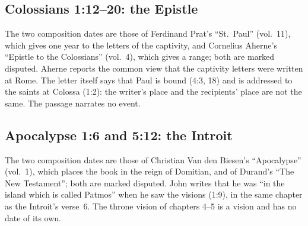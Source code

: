 \subsection{Colossians 1:12--20: the Epistle}
\label{sec:date-colossians}

The two composition dates are those of Ferdinand Prat's ``St.~Paul''
(vol.~11), which gives one year to the letters of the captivity, and Cornelius
Aherne's ``Epistle to the Colossians'' (vol.~4), which gives a range; both
are marked disputed. Aherne reports the common view that the captivity
letters were written at Rome. The letter itself says that Paul is bound (4:3,
18) and is addressed to the saints at Colossa (1:2): the writer's place and the
recipients' place are not the same. The passage narrates no event.

\subsection{Apocalypse 1:6 and 5:12: the Introit}
\label{sec:date-apocalypse}

The two composition dates are those of Christian Van den Biesen's
``Apocalypse'' (vol.~1), which places the book in the reign of Domitian, and of
Durand's ``The New Testament''; both are marked disputed. John writes that he
was ``in the island which is called Patmos'' when he saw the visions (1:9),
in the same chapter as the Introit's verse~6. The throne vision of chapters
4--5 is a vision and has no date of its own.
